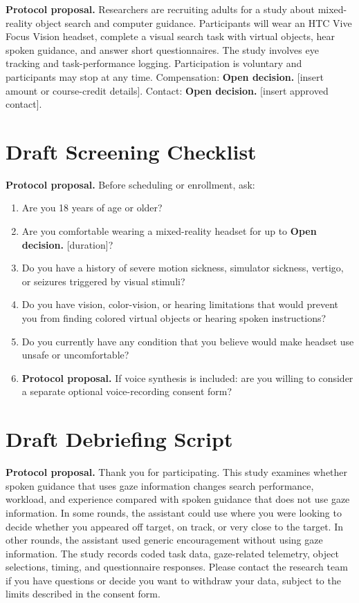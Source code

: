 \documentclass[11pt,letterpaper]{article}
\newcommand{\status}[1]{\textbf{#1.}}
\begin{document}
\status{Protocol proposal} Researchers are recruiting adults for a study about mixed-reality object search and computer guidance. Participants will wear an HTC Vive Focus Vision headset, complete a visual search task with virtual objects, hear spoken guidance, and answer short questionnaires. The study involves eye tracking and task-performance logging. Participation is voluntary and participants may stop at any time. Compensation: \status{Open decision} [insert amount or course-credit details]. Contact: \status{Open decision} [insert approved contact].

\section{Draft Screening Checklist}

\status{Protocol proposal} Before scheduling or enrollment, ask:
\begin{enumerate}
  \item Are you 18 years of age or older?
  \item Are you comfortable wearing a mixed-reality headset for up to \status{Open decision} [duration]?
  \item Do you have a history of severe motion sickness, simulator sickness, vertigo, or seizures triggered by visual stimuli?
  \item Do you have vision, color-vision, or hearing limitations that would prevent you from finding colored virtual objects or hearing spoken instructions?
  \item Do you currently have any condition that you believe would make headset use unsafe or uncomfortable?
  \item \status{Protocol proposal} If voice synthesis is included: are you willing to consider a separate optional voice-recording consent form?
\end{enumerate}

\section{Draft Debriefing Script}

\status{Protocol proposal} Thank you for participating. This study examines whether spoken guidance that uses gaze information changes search performance, workload, and experience compared with spoken guidance that does not use gaze information. In some rounds, the assistant could use where you were looking to decide whether you appeared off target, on track, or very close to the target. In other rounds, the assistant used generic encouragement without using gaze information. The study records coded task data, gaze-related telemetry, object selections, timing, and questionnaire responses. Please contact the research team if you have questions or decide you want to withdraw your data, subject to the limits described in the consent form.
\end{document}
